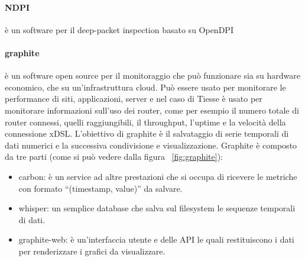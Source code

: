 \paragraph{NDPI} è un software per il deep-packet inspection basato su OpenDPI


\paragraph{graphite} è un software open source per il monitoraggio che può funzionare sia su hardware economico, che su un'infrastruttura cloud. Può essere usato per monitorare le performance di siti, applicazioni, server e nel caso di Tiesse è usato per monitorare informazioni sull'uso dei router, come per esempio il numero totale di router connessi, quelli raggiungibili, il throughput, l'uptime e la velocità della connessione xDSL.
L'obiettivo di graphite è il salvataggio di serie temporali di dati numerici e la successiva condivisione e visualizzazione.
Graphite è composto da tre parti (come si può vedere dalla figura ~\ref{fig:graphite}):

\begin{itemize}
    \item carbon: è un service ad altre prestazioni che si occupa di ricevere le metriche con formato ``(timestamp, value)'' da salvare.
    \item whisper: un semplice database che salva sul filesystem le sequenze temporali di dati.
    \item graphite-web: è un'interfaccia utente e delle API le quali restituiscono i dati per renderizzare i grafici da visualizzare.
\end{itemize}

